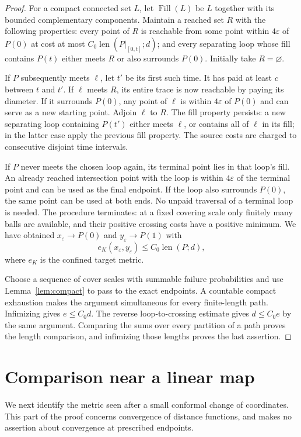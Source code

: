 \documentclass[11pt]{article}
\theoremstyle{definition}
\theoremstyle{remark}
\newcommand{\len}{\operatorname{len}}
\newcommand{\eps}{\varepsilon}
\begin{document}
\begin{proof}
For a compact connected set $L$, let $\operatorname{Fill}(L)$ be
$L$ together with its bounded complementary components. Maintain a
reached set $R$ with the following properties: every point of $R$
is reachable from some point within $4\eps$ of $P(0)$ at cost at
most $C_0\len(P|_{[0,t]};d)$; and every separating loop whose fill
contains $P(t)$ either meets $R$ or also surrounds $P(0)$.
Initially take $R=\varnothing$.

If $P$ subsequently meets $\ell$, let $t'$ be its first such time.
It has paid at least $c$ between $t$ and $t'$. If $\ell$ meets $R$,
its entire trace is now reachable by paying its diameter. If it
surrounds $P(0)$, any point of $\ell$ is within $4\eps$ of $P(0)$
and can serve as a new starting point. Adjoin $\ell$ to $R$.
The fill property persists: a new separating loop containing
$P(t')$ either meets $\ell$, or contains all of $\ell$ in its fill;
in the latter case apply the previous fill property. The source
costs are charged to consecutive disjoint time intervals.

If $P$ never meets the chosen loop again, its terminal point lies
in that loop's fill. An already reached intersection point with
the loop is within $4\eps$ of the terminal point and can be used
as the final endpoint. If the loop also surrounds $P(0)$, the same
point can be used at both ends. No unpaid traversal of a terminal
loop is needed. The procedure terminates: at a fixed covering
scale only finitely many balls are available, and their positive
crossing costs have a positive minimum. We have obtained
$x_\eps\to P(0)$ and $y_\eps\to P(1)$ with
\[
               e_K(x_\eps,y_\eps)\le C_0\len(P;d),
\]
where $e_K$ is the confined target metric.

Choose a sequence of cover scales with summable failure
probabilities and use Lemma~\ref{lem:compact} to pass to the exact
endpoints. A countable compact exhaustion makes the argument
simultaneous for every finite-length path. Infimizing gives
$e\le C_0d$. The reverse loop-to-crossing estimate gives
$d\le C_0e$ by the same argument. Comparing the sums over every
partition of a path proves the length comparison, and infimizing
those lengths proves the last assertion.
\end{proof}

\section{Comparison near a linear map}\label{sec:tangent}
We next identify the metric seen after a small conformal change
of coordinates. This part of the proof concerns convergence of
distance functions, and makes no assertion about convergence at
prescribed endpoints.
\end{document}

